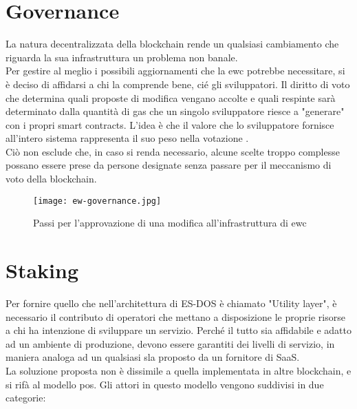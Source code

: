 \section{Governance}
La natura decentralizzata della blockchain rende un qualsiasi cambiamento che riguarda la sua infrastruttura un problema non banale. \\
Per gestire al meglio i possibili aggiornamenti che la \gls{ewc} potrebbe necessitare, si è deciso di affidarsi a chi la comprende bene, cié gli sviluppatori.
Il diritto di voto che determina quali proposte di modifica vengano accolte e quali respinte sarà determinato dalla quantità di gas che un singolo sviluppatore riesce a "generare" con i propri smart contracts.
L'idea è che il valore che lo sviluppatore fornisce all'intero sistema rappresenta il suo peso nella votazione \cite{wiki:ew-governance}. \\
Ciò non esclude che, in caso si renda necessario, alcune scelte troppo complesse possano essere prese da persone designate senza passare per il meccanismo di voto della blockchain.

\begin{figure}[h]
    \texttt{[image: ew-governance.jpg]}
    \centering
    \caption{Passi per l'approvazione di una modifica all'infrastruttura di \gls{ewc} \cite{img:ew-governance}}
    \label{lab:ew-governance}
\end{figure}

\section{Staking}
\label{sec:staking}
Per fornire quello che nell'architettura di ES-DOS è chiamato "Utility layer", è necessario il contributo di operatori che mettano a disposizione le proprie risorse a chi ha intenzione di sviluppare un servizio.
Perché il tutto sia affidabile e adatto ad un ambiente di produzione, devono essere garantiti dei livelli di servizio, in maniera analoga ad un qualsiasi \gls{sla} proposto da un fornitore di SaaS. \\
La soluzione proposta non è dissimile a quella implementata in altre blockchain, e si rifà al modello \gls{pos}.
Gli attori in questo modello vengono suddivisi in due categorie:

